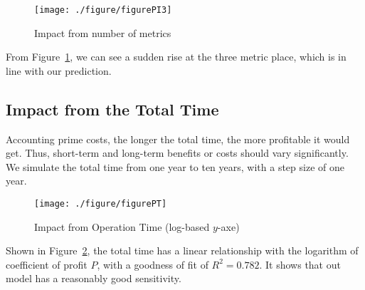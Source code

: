\documentclass[./main.tex]{subfiles}
\begin{document}
    \begin{figure}[H]
        \centering
        \texttt{[image: ./figure/figurePI3]}
        \caption{Impact from number of metrics}
        \label{fig:figurePI}
    \end{figure}

    From Figure~\ref{fig:figurePI}, we can see a sudden rise at the three metric place, which is in line with our
    prediction.
    
    \subsection{Impact from the Total Time}
    Accounting prime costs, the longer the total time, the more profitable it would get.
    Thus, short-term and long-term benefits or costs should vary significantly.
    We simulate the total time from one year to ten years, with a step size of one year.

    \begin{figure}[H]
        \centering
        \texttt{[image: ./figure/figurePT]}
        \caption{Impact from Operation Time (log-based $y$-axe)}
        \label{fig:figurePT}
    \end{figure}

    Shown in Figure~\ref{fig:figurePT}, the total time has a linear relationship with the logarithm of coefficient of profit $P$,
    with a goodness of fit of $R^2=0.782$.
    It shows that out model has a reasonably good sensitivity.
\end{document}
